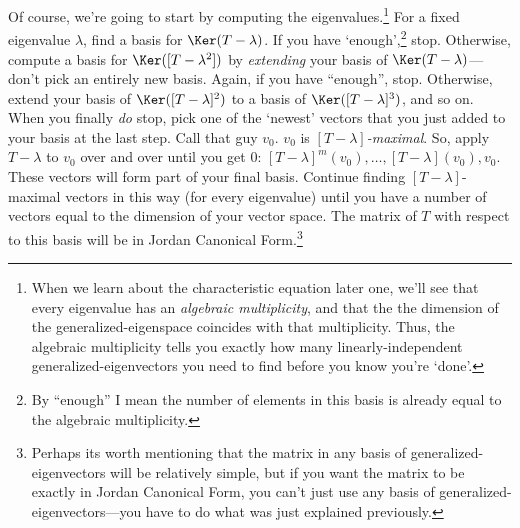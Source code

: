 Of course, we're going to start by computing the eigenvalues.\footnote{When we learn about the characteristic equation later one, we'll see that every eigenvalue has an \emph{algebraic multiplicity}, and that the the dimension of the generalized-eigenspace coincides with that multiplicity.  Thus, the algebraic multiplicity tells you exactly how many linearly-independent generalized-eigenvectors you need to find before you know you're `done'.}  For a fixed eigenvalue $\lambda$, find a basis for $\Ker (T-\lambda )$.  If you have `enough',\footnote{By ``enough'' I mean the number of elements in this basis is already equal to the algebraic multiplicity.} stop.  Otherwise, compute a basis for $\Ker ([T-\lambda ^2])$ by \emph{extending} your basis of $\Ker (T-\lambda )$---don't pick an entirely new basis.  Again, if you have ``enough'', stop.  Otherwise, extend your basis of $\Ker ([T-\lambda ]^2)$ to a basis of $\Ker ([T-\lambda ]^3)$, and so on.  When you finally \emph{do} stop, pick one of the `newest' vectors that you just added to your basis at the last step.  Call that guy $v_0$.  $v_0$ is \emph{$[T-\lambda ]$-maximal}.  So, apply $T-\lambda$ to $v_0$ over and over until you get $0$:  $[T-\lambda ]^m(v_0),\ldots ,[T-\lambda ](v_0),v_0$.  These vectors will form part of your final basis.  Continue finding $[T-\lambda ]$-maximal vectors in this way (for every eigenvalue) until you have a number of vectors equal to the dimension of your vector space.  The matrix of $T$ with respect to this basis will be in Jordan Canonical Form.\footnote{Perhaps its worth mentioning that the matrix in any basis of generalized-eigenvectors will be relatively simple, but if you want the matrix to be exactly in Jordan Canonical Form, you can't just use any basis of generalized-eigenvectors---you have to do what was just explained previously.}
